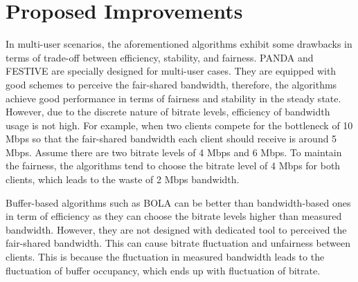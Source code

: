 \documentclass[journal]{IEEEtran}
\begin{document}
\section{Proposed Improvements}
In multi-user scenarios, the aforementioned algorithms exhibit some drawbacks in terms of trade-off between efficiency, stability, and fairness. PANDA and FESTIVE are specially designed for multi-user cases. They are equipped with good schemes to perceive the fair-shared bandwidth, therefore, the algorithms achieve good performance in terms of fairness and stability in the steady state. However, due to the discrete nature of bitrate levels, efficiency of bandwidth usage is not high. For example, when two clients compete for the bottleneck of 10 Mbps so that the fair-shared bandwidth each client should receive is around 5 Mbps. Assume there are two bitrate levels of 4 Mbps and 6 Mbps. To maintain the fairness, the algorithms tend to choose the bitrate level of 4 Mbps for both clients, which leads to the waste of 2 Mbps bandwidth.  
\par Buffer-based algorithms such as BOLA can be better than bandwidth-based ones in term of efficiency as they can choose the bitrate levels higher than measured bandwidth. However, they are not designed with dedicated tool to perceived the fair-shared bandwidth. This can cause bitrate fluctuation and unfairness between clients. This is because the fluctuation in measured bandwidth leads to the fluctuation of buffer occupancy, which ends up with fluctuation of bitrate.
\end{document}
